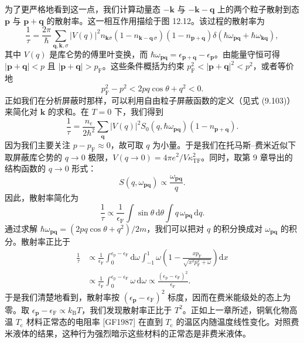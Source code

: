 为了更严格地看到这一点，我们计算动量态 $-\mathbf k$ 与 $-\mathbf k-\mathbf q$ 上的两个粒子散射到态 $\mathbf p$ 与 $\mathbf p+\mathbf q$ 的散射率。这一相互作用描绘于图 12.12。该过程的散射率为
\begin{equation*}
\frac{1}{\tau}=\frac{2\pi}{\hbar}\sum_{\mathbf q,\mathbf k,\sigma}|V(q)|^2 n_{\mathbf k\sigma}\left(1-n_{\mathbf k-\mathbf q\,\sigma}\right)\left(1-n_{\mathbf p+\mathbf q}\right)\delta\left(\hbar\omega_{\mathbf p\mathbf q}+\hbar\omega_{\mathbf k\mathbf q}\right), \tag{12.62}
\end{equation*}
其中 $V(q)$ 是库仑势的傅里叶变换，而 $\hbar\omega_{\mathbf p\mathbf q}=\epsilon_{\mathbf p+\mathbf q}-\epsilon_{\mathbf p}$。由能量守恒可得 $|\mathbf p+\mathbf q|<p$ 且 $|\mathbf p+\mathbf q|>p_{\mathrm F}$。这些条件概括为约束 $p_{\mathrm F}^2<|\mathbf p+\mathbf q|^2<p^2$，或者等价地
\begin{equation*}
p_{\mathrm F}^2-p^2<2pq\cos\theta+q^2<0. \tag{12.63}
\end{equation*}
正如我们在分析屏蔽时那样，可以利用自由粒子屏蔽函数的定义（见式 (9.103)）来简化对 $\mathbf k$ 的求和。在 $T=0$ 下，我们得到
\begin{equation*}
\frac{1}{\tau}=\frac{n_e}{2\hbar^2}\sum_{\mathbf q}|V(q)|^2 S_0(q,\hbar\omega_{\mathbf p\mathbf q})\left(1-n_{\mathbf p+\mathbf q}\right). \tag{12.64}
\end{equation*}
因为我们主要关注 $p-p_{\mathrm F}\approx 0$，故可取 $q$ 为小量。于是我们在托马斯–费米近似下取屏蔽库仑势的 $q\to 0$ 极限，$V(q\to 0)=4\pi e^2/V\kappa_{\mathrm{TF}}^2$。同时，取第 9 章导出的结构函数的 $q\to 0$ 形式：
\begin{equation*}
S(q,\omega_{\mathbf p\mathbf q})\propto\frac{\omega_{\mathbf p\mathbf q}}{q}. \tag{12.65}
\end{equation*}
因此，散射率简化为
\begin{equation*}
\frac{1}{\tau}\propto\frac{1}{\epsilon_{\mathrm F}}\int\sin\theta\,\mathrm d\theta\int q\,\omega_{\mathbf p\mathbf q}\,\mathrm d q. \tag{12.66}
\end{equation*}
通过求解 $\hbar\omega_{\mathbf p\mathbf q}=(2pq\cos\theta+q^2)/2m$，我们可以把对 $q$ 的积分换成对 $\omega_{\mathbf p\mathbf q}$ 的积分。散射率正比于
\begin{align*}
\frac{1}{\tau}&\propto\frac{1}{\epsilon_{\mathrm F}}\int_0^{\epsilon_{\mathrm p}-\epsilon_{\mathrm F}}\mathrm d\omega\int_{-1}^{1}\omega\left(1-\frac{xp_{\mathrm F}}{\sqrt{x^2p_{\mathrm F}^2+\omega}}\right)\mathrm d x\\
&\propto\frac{1}{\epsilon_{\mathrm F}}\int_0^{\epsilon_{\mathrm p}-\epsilon_{\mathrm F}}\omega\,\mathrm d\omega\propto\frac{(\epsilon_{\mathrm p}-\epsilon_{\mathrm F})^2}{\epsilon_{\mathrm F}}. \tag{12.67}
\end{align*}
于是我们清楚地看到，散射率按 $(\epsilon_{\mathbf p}-\epsilon_{\mathrm F})^2$ 标度，因而在费米能级处的态上为零。取 $\epsilon_{\mathbf p}-\epsilon_{\mathrm F}\propto k_{\mathrm B}T$，我们发现散射率正比于 $T^2$。正如上一章所述，铜氧化物高温 $T_{\mathrm c}$ 材料正常态的电阻率 [GF1987] 在直到 $T_{\mathrm c}$ 的温区内随温度线性变化。对照费米液体的结果，这种行为强烈暗示这些材料的正常态是非费米液体。

